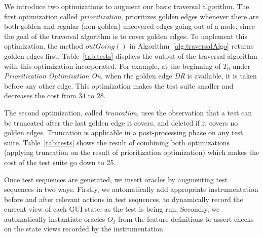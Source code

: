 We introduce two optimizations to augment our basic traversal algorithm. The first optimization called \textit{prioritization}, prioritizes golden edges whenever there are both golden and regular (non-golden) uncovered edges going out of a node, since the goal of the traversal algorithm is to cover golden edges. To implement this optimization, the method $outGoing()$ in Algorithm~\ref{alg:traversalAlgo} returns golden edges first. Table~\ref{tab:tests} displays the output of the traversal algorithm with this optimization incorporated. For example, at the beginning of \emph{$T_0$} under \emph{Prioritization Optimization On}, when the golden edge \emph{DR} is available, it is taken before any other edge. This optimization makes the test suite smaller and decreases the cost from $34$ to $28$.

The second optimization, called \textit{truncation}, uses the observation that a test can be truncated after the last golden edge it covers, and deleted if it covers no golden edges. Truncation is applicable in a post-processing phase on any test suite. Table~\ref{tab:tests} shows the result of combining both optimizations (applying truncation on the result of prioritization optimization) which makes the cost of the test suite go down to 25.

Once test sequences are generated, we insert oracles by augmenting test sequences in two ways.
Firstly, we automatically add appropriate instrumentation before and after relevant actions in test sequences, to dynamically record %
the current view of each GUI state, as the test is being run. Secondly, we automatically instantiate oracles $O_f$ from the feature definitions to assert checks on the state views recorded by the instrumentation.

